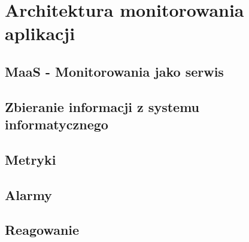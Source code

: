 \chapter{Architektura monitorowania aplikacji}
\label{chapter:monitoring_architecture}


\section{\textbf{MaaS} - Monitorowania jako serwis}

\section{Zbieranie informacji z systemu informatycznego}
\section{Metryki}
\section{Alarmy}
\section{Reagowanie}